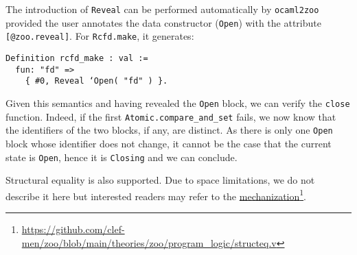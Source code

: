 The introduction of \texttt{Reveal} can be performed automatically by \texttt{ocaml2zoo} provided the user annotates the data constructor (\eg \texttt{Open}) with the attribute \texttt{[@zoo.reveal]}.
For \texttt{Rcfd.make}, it generates:

\begin{verbatim}
Definition rcfd_make : val :=
  fun: "fd" =>
    { #0, Reveal ‘Open( "fd" ) }.
\end{verbatim}

Given this semantics and having revealed the \texttt{Open} block, we can verify the \texttt{close} function.
Indeed, if the first \texttt{Atomic.compare_and_set} fails, we now know that the identifiers of the two blocks, if any, are distinct.
As there is only one \texttt{Open} block whose identifier does not change, it cannot be the case that the current state is \texttt{Open}, hence it is \texttt{Closing} and we can conclude.

Structural equality is also supported.
Due to space limitations, we do not describe it here but interested readers may refer to the \Rocq \href{https://github.com/clef-men/zoo/blob/main/theories/zoo/program_logic/structeq.v}{mechanization}\footnote{\url{https://github.com/clef-men/zoo/blob/main/theories/zoo/program\_logic/structeq.v}}.